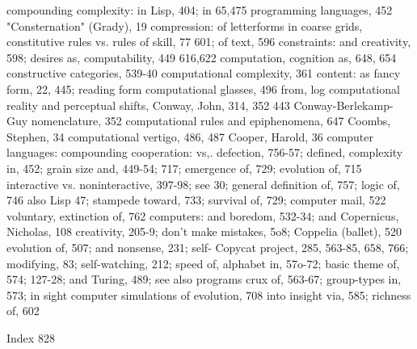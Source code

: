 compounding complexity: in Lisp, 404; in           65,475
 programming languages, 452                       "Consternation" (Grady), 19
compression: of letterforms in coarse grids,      constitutive rules vs. rules of skill, 77
 601; of text, 596                                 constraints: and creativity, 598; desires as,
computability, 449                                 616,622
computation, cognition as, 648, 654               constructive categories, 539-40
computational complexity, 361                     content: as fancy form, 22, 445; reading form
computational glasses, 496                         from, log
computational reality and perceptual shifts,      Conway, John, 314, 352
443                                               Conway-Berlekamp-Guy nomenclature, 352
computational rules and epiphenomena, 647         Coombs, Stephen, 34
computational vertigo, 486, 487                   Cooper, Harold, 36
computer languages: compounding                   cooperation: vs,. defection, 756-57; defined,
 complexity in, 452; grain size and, 449-54;       717; emergence of, 729; evolution of, 715
 interactive vs. noninteractive, 397-98; see       30; general definition of, 757; logic of, 746
 also Lisp                                         47; stampede toward, 733; survival of, 729;
computer mail, 522                                 voluntary, extinction of, 762
computers: and boredom, 532-34; and               Copernicus, Nicholas, 108
 creativity, 205-9; don't make mistakes, 5o8;     Coppelia (ballet), 520
 evolution of, 507; and nonsense, 231; self-      Copycat project, 285, 563-85, 658, 766;
 modifying, 83; self-watching, 212; speed of,      alphabet in, 57o-72; basic theme of, 574;
 127-28; and Turing, 489; see also programs        crux of, 563-67; group-types in, 573; in sight
computer simulations of evolution, 708             into insight via, 585; richness of, 602

 Index                                                                                       828

